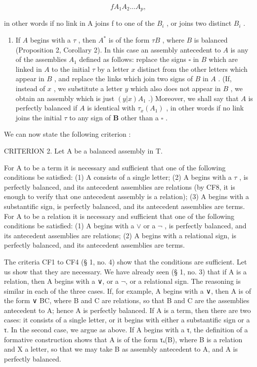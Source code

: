 \[
f A _ {1} A _ {2} \dots A _ {p},
\]

in other words if no link in A joins f to one of the \(B_{i}\) , or joins two distinct \(B_{i}\) .

\begin{enumerate}
\def\labelenumi{(\arabic{enumi})}
\setcounter{enumi}{1}
\tightlist
\item
  If \(A\) begins with a \(\tau\) , then \(A^*\) is of the form \(\tau B\) , where \(B\) is balanced (Proposition 2, Corollary 2). In this case an assembly antecedent to \(A\) is any of the assemblies \(A_1\) defined as follows: replace the signs \(\square\) in \(B\) which are linked in \(A\) to the initial \(\tau\) by a letter \(x\) distinct from the other letters which appear in \(B\) , and replace the links which join two signs of \(B\) in \(A\) . (If, instead of \(x\) , we substitute a letter \(y\) which also does not appear in \(B\) , we obtain an assembly which is just \((y|x)A_1\) .) Moreover, we shall say that \(A\) is perfectly balanced if \(A\) is identical with \(\tau_{x}(A_1)\) , in other words if no link joins the initial \(\tau\) to any sign of \(\pmb{B}\) other than a \(\square\) .
\end{enumerate}

We can now state the following criterion :

CRITERION 2. Let A be a balanced assembly in T.

For A to be a term it is necessary and sufficient that one of the following conditions be satisfied: (1) A consists of a single letter; (2) A begins with a \(\tau\) , is perfectly balanced, and its antecedent assemblies are relations (by CF8, it is enough to verify that one antecedent assembly is a relation); (3) A begins with a substantific sign, is perfectly balanced, and its antecedent assemblies are terms. For A to be a relation it is necessary and sufficient that one of the following conditions be satisfied: (1) A begins with a \(\vee\) or a \(\neg\) , is perfectly balanced, and its antecedent assemblies are relations; (2) A begins with a relational sign, is perfectly balanced, and its antecedent assemblies are terms.

The criteria CF1 to CF4 (§ 1, no. 4) show that the conditions are sufficient. Let us show that they are necessary. We have already seen (§ 1, no. 3) that if A is a relation, then A begins with a ∨, or a \(\neg\), or a relational sign. The reasoning is similar in each of the three cases. If, for example, A begins with a ∨, then A is of the form ∨ BC, where B and C are relations, so that B and C are the assemblies antecedent to A; hence A is perfectly balanced. If A is a term, then there are two cases: it consists of a single letter, or it begins with either a substantific sign or a τ. In the second case, we argue as above. If A begins with a τ, the definition of a formative construction shows that A is of the form τₓ(B), where B is a relation and X a letter, so that we may take B as assembly antecedent to A, and A is perfectly balanced.

